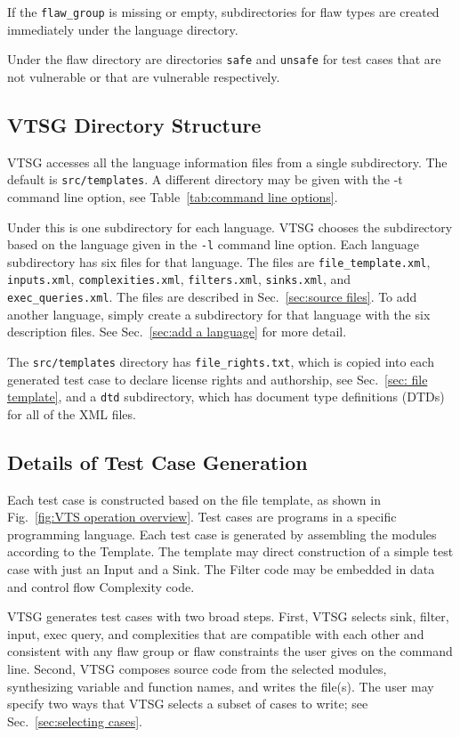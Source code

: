 If the \verb|flaw_group| is missing or empty, subdirectories for flaw types are
created immediately under the language directory.

Under the flaw directory are directories \verb|safe| and \verb|unsafe| for test
cases that are not vulnerable or that are vulnerable respectively.

\subsection{VTSG Directory Structure}
\label{sec: directory structure}

VTSG accesses all the language information files from a single subdirectory.
The default is \verb|src/templates|.  A different directory may be
given with the -t command
line option, see Table~\ref{tab:command line options}.

Under this is one subdirectory for each language.  VTSG chooses the
subdirectory based on the language given in the \verb|-l| command line
option.  Each language subdirectory has six files for that language.
The files are \verb|file_template.xml|, \verb|inputs.xml|,
\verb|complexities.xml|, \verb|filters.xml|, \verb|sinks.xml|,
and \verb|exec_queries.xml|.
The files are described in Sec.~\ref{sec:source files}.
To add another language,
simply create a subdirectory for that language with the six description
files.  See Sec.~\ref{sec:add a language} for more detail.

The \verb|src/templates| directory has \verb|file_rights.txt|, which is
copied into each generated test case to declare license rights and
authorship, see Sec.~\ref{sec: file template}, and a 
\verb|dtd| subdirectory, which has document type definitions (DTDs)
for all of the XML files.


\subsection{Details of Test Case Generation}
\label{sec: generation detail}

Each test case is constructed based on the file template, as shown
in Fig.~\ref{fig:VTS operation overview}. Test cases are 
programs in a specific programming language.
Each test case is generated by
assembling the modules according to the Template.  The
template may direct construction of a simple test case with just
an Input and a Sink.
The Filter code may be embedded in data and control flow
Complexity code.

VTSG generates test cases with two broad steps.  First, VTSG selects
sink, filter, input, exec query, and complexities that are
compatible with each other and consistent with any flaw group or
flaw constraints the user gives on the command line.  Second, VTSG
composes source code from the selected modules, 
synthesizing variable and function names, and writes the file(s).
The user may specify two ways that VTSG selects a subset of cases to write; see
Sec.~\ref{sec:selecting cases}.

